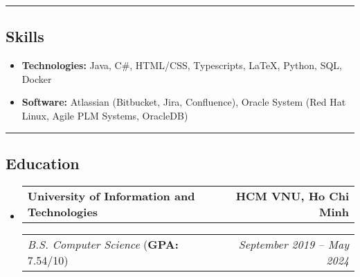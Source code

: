 \documentclass[11pt,letterpaper]{article}
\makeatletter
\newcommand{\headerrow}[2]
{\begin{tabular*}{\linewidth}{l@{\extracolsep{\fill}}r}
#1 &
#2 \\
\end{tabular*}}
\makeatother
\begin{document}
\hrule
\vspace{-1em}
\subsection*{\Large Skills}

\begin{itemize}[leftmargin=1em,noitemsep]
    \item \textbf{Technologies:}
          Java, C\#, HTML/CSS, Typescripts, \LaTeX, Python, SQL, Docker
    \item \textbf{Software:}
          Atlassian (Bitbucket, Jira, Confluence), Oracle System (Red Hat Linux, Agile PLM Systems, OracleDB)
\end{itemize}

\hrule
\vspace{-1em}
\subsection*{\Large Education}

\begin{itemize}[leftmargin=1em]
    \parskip=0.1em

    \item
          \headerrow
          {\textbf{University of Information and Technologies}}
          {\textbf{HCM VNU, Ho Chi Minh}}
          \headerrow
          {\emph{B.S. Computer Science} (\textbf{GPA:} 7.54/10)}
          {\emph{September 2019 -- May 2024}}


\end{itemize}
\end{document}
